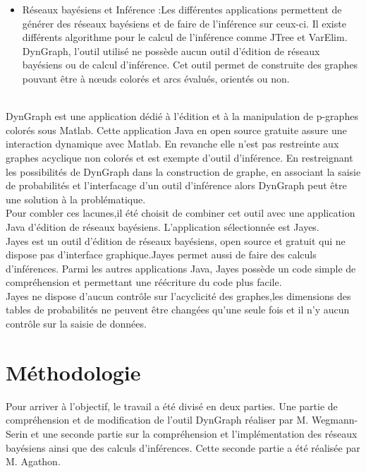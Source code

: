 \documentclass[conference]{IEEEtran}
\begin{document}
\begin{itemize}
	\item{Réseaux bayésiens et Inférence :}Les différentes applications permettent de générer des réseaux bayésiens et de faire de l'inférence sur ceux-ci. Il existe différents algorithme pour le calcul de l'inférence comme JTree et VarElim. DynGraph, l'outil utilisé ne possède aucun outil d'édition de réseaux bayésiens ou de calcul d'inférence. Cet outil permet de construite des graphes pouvant être à nœuds colorés et arcs évalués, orientés ou non. \\
	
\end{itemize}
\\

DynGraph est une application dédié à l'édition et à la manipulation de p-graphes colorés sous Matlab. Cette application Java en open source gratuite assure une interaction dynamique avec Matlab. En revanche elle n'est pas restreinte aux graphes acyclique non colorés et est exempte d'outil d'inférence. 
En restreignant les possibilités de DynGraph dans la construction de graphe, en associant la saisie de probabilités et l'interfacage d'un outil d'inférence alors DynGraph peut être une solution à la problématique. \\
Pour combler ces lacunes,il été choisit de combiner cet outil avec une application Java d'édition de réseaux bayésiens. L'application sélectionnée est Jayes.\\
Jayes est un outil d'édition de réseaux bayésiens, open source et gratuit qui ne dispose pas d'interface graphique.Jayes permet aussi de faire des calculs d'inférences. Parmi les autres applications Java, Jayes possède un code simple de compréhension et permettant une réécriture du code plus facile. \\
Jayes ne dispose d'aucun contrôle sur l'acyclicité des graphes,les dimensions des tables de probabilités ne peuvent être changées qu'une seule fois et il n'y aucun contrôle sur la saisie de données.\\ 




\section{Méthodologie}

Pour arriver à l'objectif, le travail a été divisé en deux parties. Une partie de compréhension et de modification de l'outil DynGraph réaliser par M. Wegmann-Serin et une seconde partie sur la compréhension et l'implémentation des réseaux bayésiens ainsi que des calculs d'inférences. Cette seconde partie a été réalisée par M. Agathon. \\
\end{document}
